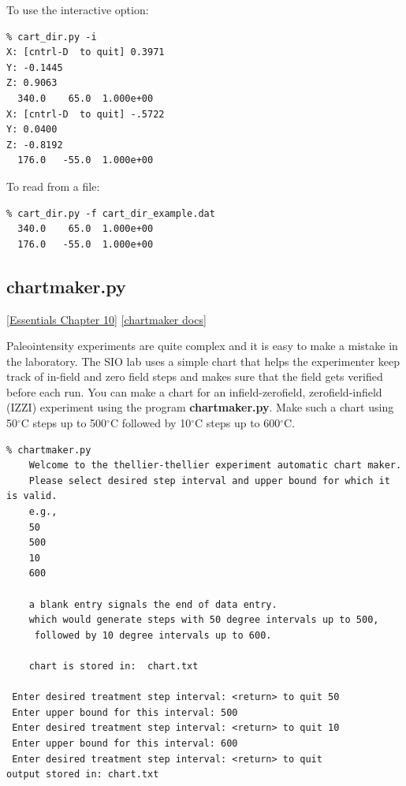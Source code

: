 \documentclass[11pt]{book}
\begin{document}
{{To use the interactive option:

\begin{verbatim}
% cart_dir.py -i
X: [cntrl-D  to quit] 0.3971
Y: -0.1445
Z: 0.9063
  340.0    65.0  1.000e+00
X: [cntrl-D  to quit] -.5722
Y: 0.0400
Z: -0.8192
  176.0   -55.0  1.000e+00
\end{verbatim}

To read from a file:

\begin{verbatim}
% cart_dir.py -f cart_dir_example.dat
  340.0    65.0  1.000e+00
  176.0   -55.0  1.000e+00
\end{verbatim}


\subsection{chartmaker.py}
\label{ex:chartmaker}
\href{http://earthref.org/MAGIC/books/Tauxe/Essentials/WebBook3ch10.html#ch10}{[Essentials Chapter 10]}
\href{https://github.com/PmagPy/PmagPy/blob/master/programs/chartmaker.py}{[chartmaker docs]}

Paleointensity experiments are quite complex and it is easy to make a mistake in the laboratory.  The SIO lab uses a simple chart that helps the experimenter keep track of in-field and zero field steps and makes sure that the field gets verified before each run.   You can make a chart for an infield-zerofield, zerofield-infield (IZZI) experiment using the program {\bf chartmaker.py}.   Make such a chart using 50$^{\circ}$C steps up to 500$^{\circ}$C  followed by 10$^{\circ}$C steps up to 600$^{\circ}$C.

\begin{verbatim}
% chartmaker.py
    Welcome to the thellier-thellier experiment automatic chart maker.
    Please select desired step interval and upper bound for which it is valid.
    e.g.,
    50
    500
    10
    600

    a blank entry signals the end of data entry.
    which would generate steps with 50 degree intervals up to 500,
     followed by 10 degree intervals up to 600.

    chart is stored in:  chart.txt

 Enter desired treatment step interval: <return> to quit 50
 Enter upper bound for this interval: 500
 Enter desired treatment step interval: <return> to quit 10
 Enter upper bound for this interval: 600
 Enter desired treatment step interval: <return> to quit
output stored in: chart.txt


\end{verbatim}}}
\end{document}
